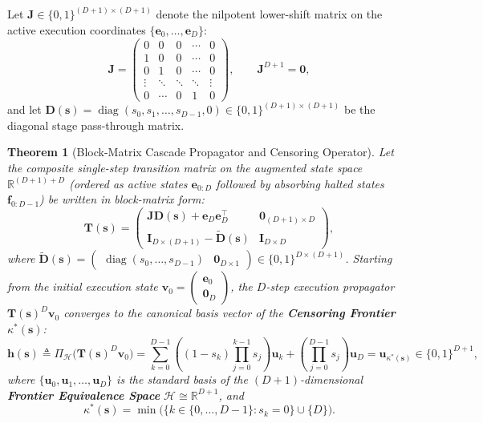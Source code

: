 \documentclass[11pt,a4paper]{article}
\newtheorem{theorem}{Theorem}[section]
\theoremstyle{definition}
\theoremstyle{remark}
\begin{document}
Let $\mathbf{J} \in \{0,1\}^{(D+1)\times(D+1)}$ denote the nilpotent lower-shift matrix on the active execution coordinates $\{\bm{e}_0, \dots, \bm{e}_D\}$:
\begin{equation}
    \mathbf{J} = \begin{pmatrix}
        0 & 0 & 0 & \cdots & 0 \\
        1 & 0 & 0 & \cdots & 0 \\
        0 & 1 & 0 & \cdots & 0 \\
        \vdots & \ddots & \ddots & \ddots & \vdots \\
        0 & \cdots & 0 & 1 & 0
    \end{pmatrix}, \qquad \mathbf{J}^{D+1} = \mathbf{0},
\end{equation}
and let $\mathbf{D}(\bm{s}) = \operatorname{diag}(s_0, s_1, \dots, s_{D-1}, 0) \in \{0,1\}^{(D+1)\times(D+1)}$ be the diagonal stage pass-through matrix.

\begin{theorem}[Block-Matrix Cascade Propagator and Censoring Operator]
Let the composite single-step transition matrix on the augmented state space $\mathbb{R}^{(D+1) + D}$ (ordered as active states $\bm{e}_{0:D}$ followed by absorbing halted states $\bm{f}_{0:D-1}$) be written in block-matrix form:
\begin{equation}
    \mathbf{T}(\bm{s}) = \begin{pmatrix}
        \mathbf{J}\mathbf{D}(\bm{s}) + \bm{e}_D \bm{e}_D^\top & \mathbf{0}_{(D+1)\times D} \\
        \mathbf{I}_{D\times(D+1)} - \widetilde{\mathbf{D}}(\bm{s}) & \mathbf{I}_{D\times D}
    \end{pmatrix},
\end{equation}
where $\widetilde{\mathbf{D}}(\bm{s}) = \begin{pmatrix} \operatorname{diag}(s_0, \dots, s_{D-1}) & \bm{0}_{D\times 1} \end{pmatrix} \in \{0,1\}^{D\times(D+1)}$. Starting from the initial execution state $\bm{v}_0 = \begin{pmatrix} \bm{e}_0 \\ \bm{0}_D \end{pmatrix}$, the $D$-step execution propagator $\mathbf{T}(\bm{s})^D \bm{v}_0$ converges to the canonical basis vector of the \textbf{Censoring Frontier} $\kappa^*(\bm{s})$:
\begin{equation}\label{eq:censoring_polynomial}
    \bm{h}(\bm{s}) \triangleq \Pi_{\mathcal{H}}\big(\mathbf{T}(\bm{s})^D \bm{v}_0\big) = \sum_{k=0}^{D-1} \left( (1 - s_k) \prod_{j=0}^{k-1} s_j \right) \bm{u}_k + \left( \prod_{j=0}^{D-1} s_j \right) \bm{u}_D = \bm{u}_{\kappa^*(\bm{s})} \in \{0,1\}^{D+1},
\end{equation}
where $\{\bm{u}_0, \bm{u}_1, \dots, \bm{u}_D\}$ is the standard basis of the $(D+1)$-dimensional \textbf{Frontier Equivalence Space} $\mathcal{H} \cong \mathbb{R}^{D+1}$, and
\begin{equation}
    \kappa^*(\bm{s}) = \min\big(\{k \in \{0,\dots,D-1\} : s_k = 0\} \cup \{D\}\big).
\end{equation}
\end{theorem}
\end{document}
